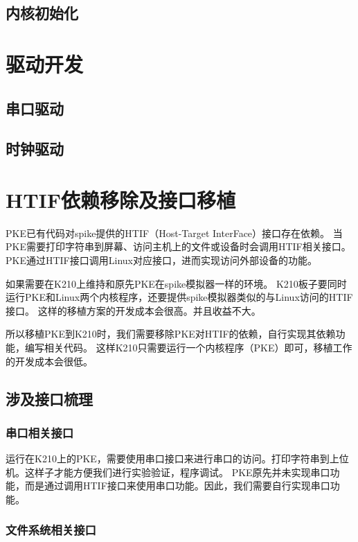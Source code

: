 \subsection{内核初始化}

\section{驱动开发}

\subsection{串口驱动}

\subsection{时钟驱动}

\section{HTIF依赖移除及接口移植}

PKE已有代码对spike提供的HTIF（Host-Target InterFace）接口存在依赖。
当PKE需要打印字符串到屏幕、访问主机上的文件或设备时会调用HTIF相关接口。
PKE通过HTIF接口调用Linux对应接口，进而实现访问外部设备的功能。

如果需要在K210上维持和原先PKE在spike模拟器一样的环境。
K210板子要同时运行PKE和Linux两个内核程序，还要提供spike模拟器类似的与Linux访问的HTIF接口。
这样的移植方案的开发成本会很高。并且收益不大。

所以移植PKE到K210时，我们需要移除PKE对HTIF的依赖，自行实现其依赖功能，编写相关代码。
这样K210只需要运行一个内核程序（PKE）即可，移植工作的开发成本会很低。

\subsection{涉及接口梳理}

\subsubsection{串口相关接口}
运行在K210上的PKE，需要使用串口接口来进行串口的访问。打印字符串到上位机。这样子才能方便我们进行实验验证，程序调试。
PKE原先并未实现串口功能，而是通过调用HTIF接口来使用串口功能。因此，我们需要自行实现串口功能。

\subsubsection{文件系统相关接口}

